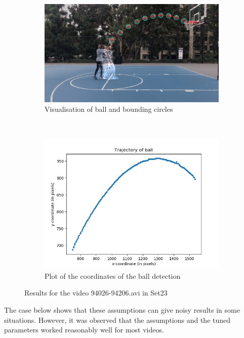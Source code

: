 \documentclass[12pt]{article}
\begin{document}
\begin{figure}[H]
    \centering
    \begin{subfigure}[b]{0.7\textwidth}
         \centering
         \includegraphics[width=\textwidth]{../results/visualisations/output_Set23_94026-94206.png}
         \caption{Visualisation of ball and bounding circles}
     \end{subfigure}\\
     \begin{subfigure}[b]{0.7\textwidth}
         \centering
         \includegraphics[width=\textwidth]{../results/plots/Set23_94026-94206.png}
         \caption{Plot of the coordinates of the ball detection}
     \end{subfigure}
     \caption{Results for the video 94026-94206.avi in Set23}
\end{figure}

The case below shows that these assumptions can give noisy results in some situations. However, it was observed that the assumptions and the tuned parameters worked reasonably well for most videos.
\end{document}
